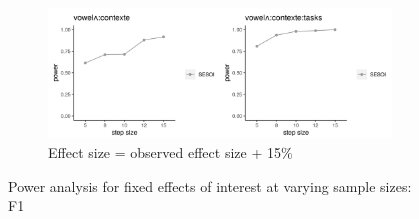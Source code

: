 \documentclass[12 pt]{article}
\begin{document}
\begin{figure}
	
	\begin{subfigure}[t]{0.8\textwidth}
		\centering
		\includegraphics[width=\textwidth]{powerplot_f1_plus15} 
		\caption{Effect size = observed effect size + 15\%} \label{f1_plus15}
	\end{subfigure}
	
	\caption{Power analysis for fixed effects of interest at varying sample sizes: F1}
	
\end{figure}
\end{document}
